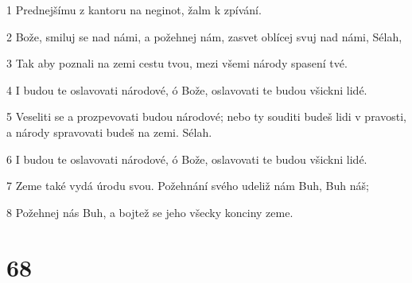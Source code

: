 \par 1 Prednejšímu z kantoru na neginot, žalm k zpívání.
\par 2 Bože, smiluj se nad námi, a požehnej nám, zasvet oblícej svuj nad námi, Sélah,
\par 3 Tak aby poznali na zemi cestu tvou, mezi všemi národy spasení tvé.
\par 4 I budou te oslavovati národové, ó Bože, oslavovati te budou všickni lidé.
\par 5 Veseliti se a prozpevovati budou národové; nebo ty souditi budeš lidi v pravosti, a národy spravovati budeš na zemi. Sélah.
\par 6 I budou te oslavovati národové, ó Bože, oslavovati te budou všickni lidé.
\par 7 Zeme také vydá úrodu svou. Požehnání svého udeliž nám Buh, Buh náš;
\par 8 Požehnej nás Buh, a bojtež se jeho všecky konciny zeme.

\chapter{68}


